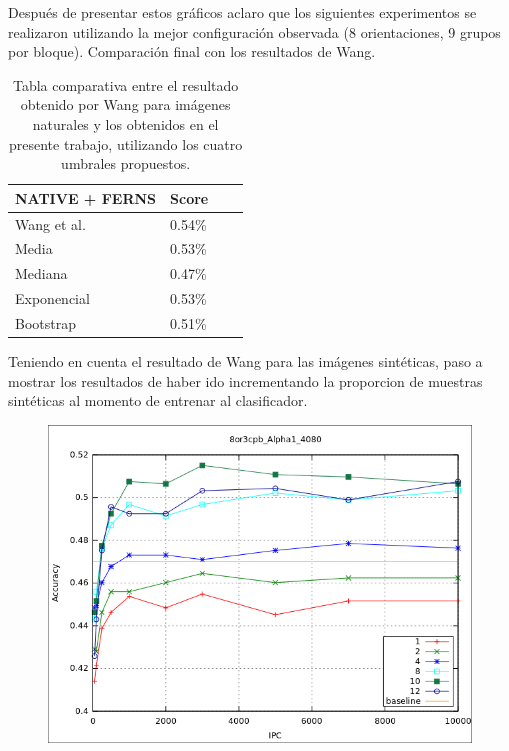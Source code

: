 		Después de presentar estos gráficos aclaro que los siguientes experimentos se realizaron utilizando la mejor configuración observada (8 orientaciones, 9 grupos por bloque). Comparación final con los resultados de Wang.
	\begin{table}
		\centering
		\begin{tabular}{ | l | l | l | p{5cm} |}
    			\hline
    				\textbf{NATIVE + FERNS} & \textbf{Score} \\ \hline
    				Wang et al. & 0.54\% \\ \hline
    				Media & 0.53\% \\ \hline
    				Mediana & 0.47\%\\ \hline
    				Exponencial & 0.53\% \\ \hline
    				Bootstrap & 0.51\%\\ 
    			\hline
    		\end{tabular}
    		\caption{Tabla comparativa entre el resultado obtenido por Wang para imágenes naturales y los obtenidos en el presente trabajo, utilizando los cuatro umbrales propuestos.}
    	\end{table}
    	
    	Teniendo en cuenta el resultado de Wang para las imágenes sintéticas, paso a mostrar 
los resultados de haber ido incrementando la proporcion de muestras sintéticas al momento de entrenar al clasificador.

			\begin{figure}[htbp]
				\centering
				\includegraphics[scale=0.6]{img/resultados/sinteticas/best_media_8or3cpb_Alpha1_4080.png}
				\caption[Sintéticas media bajo resultado]{}
				\label{fig: Sinteticas-media-bajo}
			\end{figure}
			
